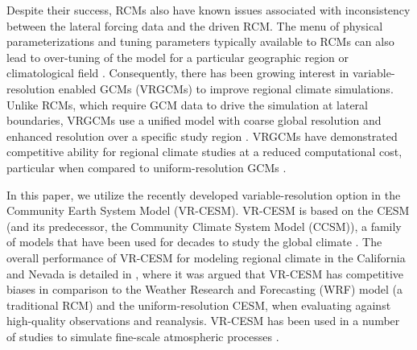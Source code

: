 Despite their success, RCMs also have known issues associated with inconsistency between the lateral forcing data and the driven RCM.  The menu of physical parameterizations and tuning parameters typically available to RCMs can also lead to over-tuning of the model for a particular geographic region or climatological field \cite{mcdonald2003transparent, laprise2008challenging, mesinger2013limited}.  Consequently, there has been growing interest in variable-resolution enabled GCMs (VRGCMs) to improve regional climate simulations. Unlike RCMs, which require GCM data to drive the simulation at lateral boundaries, VRGCMs use a unified model with coarse global resolution and enhanced resolution over a specific study region \cite{staniforth1978variable, fox1997finite}. VRGCMs have demonstrated competitive ability for regional climate studies at a reduced computational cost, particular when compared to uniform-resolution GCMs \cite{fox2006variable, rauscher2013exploring}.


In this paper, we utilize the recently developed variable-resolution option in the Community Earth System Model (VR-CESM).  VR-CESM is based on the CESM (and its predecessor, the Community Climate System Model (CCSM)), a family of models that have been used for decades to study the global climate \cite{neale2010description, hurrell2013community}.  The overall performance of VR-CESM for modeling regional climate in the California and Nevada is detailed in \cite{huang2016evaluation}, where it was argued that VR-CESM has competitive biases in comparison to the Weather Research and Forecasting (WRF) model (a traditional RCM) and the uniform-resolution CESM, when evaluating against high-quality observations and reanalysis. VR-CESM has been used in a number of studies to simulate fine-scale atmospheric processes  \cite{zarzycki2014using, zarzycki2015effects, rhoades2015characterizing, huang2016irrigation, rhoades2016projecting}.


